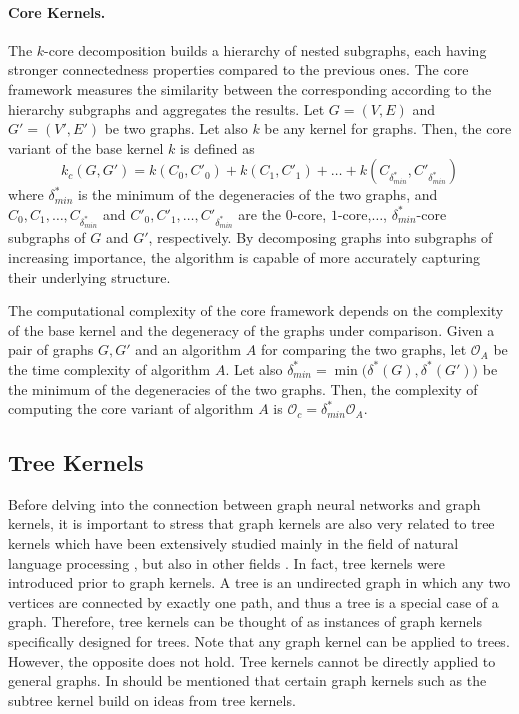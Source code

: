 \documentclass[twoside,11pt]{article}
\begin{document}
\paragraph{Core Kernels.}
The $k$-core decomposition builds a hierarchy of nested subgraphs, each having stronger connectedness properties compared to the previous ones.
The core framework measures the similarity between the corresponding according to the hierarchy subgraphs and aggregates the results.
Let $G=(V,E)$ and $G'=(V',E')$ be two graphs.
Let also $k$ be any kernel for graphs.
Then, the core variant of the base kernel $k$ is defined as
\begin{equation}
  k_c(G, G') = k(C_0,C'_0) + k(C_1,C'_1) + \ldots + k(C_{\delta^*_{min}},C'_{\delta^*_{min}}) 
\end{equation}
where $\delta^*_{min}$ is the minimum of the degeneracies of the two graphs, and $C_0,C_1,\ldots,C_{\delta^*_{min}}$ and $C'_0,C'_1,\ldots,C'_{\delta^*_{min}}$ are the $0$-core, $1$-core,$\ldots$, $\delta^*_{min}$-core subgraphs of $G$ and $G'$, respectively.
By decomposing graphs into subgraphs of increasing importance, the algorithm is capable of more accurately capturing their underlying structure.

The computational complexity of the core framework depends on the complexity of the base kernel and the degeneracy of the graphs under comparison.
Given a pair of graphs $G, G'$ and an algorithm $A$ for comparing the two graphs, let $\mathcal{O}_A$ be the time complexity of algorithm $A$.
Let also $\delta^*_{min} = \min \big( \delta^*(G),\delta^*(G') \big)$ be the minimum of the degeneracies of the two graphs.
Then, the complexity of computing the core variant of algorithm $A$ is $\mathcal{O}_{c}=\delta^*_{min}\mathcal{O}_A$.

\subsection{Tree Kernels}\label{sec:tree_kernels}
Before delving into the connection between graph neural networks and graph kernels, it is important to stress that graph kernels are also very related to tree kernels which have been extensively studied mainly in the field of natural language processing , but also in other fields .
In fact, tree kernels were introduced prior to graph kernels.
A tree is an undirected graph in which any two vertices are connected by exactly one path, and thus a tree is a special case of a graph.
Therefore, tree kernels can be thought of as instances of graph kernels specifically designed for trees.
Note that any graph kernel can be applied to trees.
However, the opposite does not hold.
Tree kernels cannot be directly applied to general graphs.
In should be mentioned that certain graph kernels such as the subtree kernel build on ideas from tree kernels.
\end{document}
